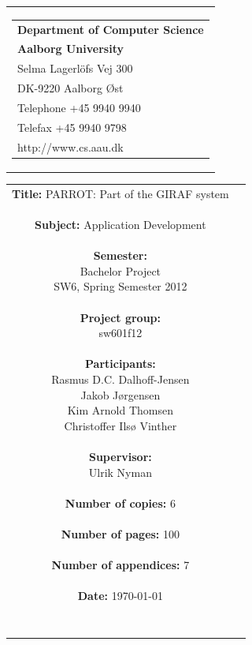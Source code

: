 \begin{nopagebreak}
\samepage 
\begin{tabular}{r}
\parbox{\textwidth}{
\hfill \parbox{6.2cm}{\begin{tabular}{l}
{\textsf\small \textbf{Department of Computer Science }}\\
{\textsf\small  \textbf{Aalborg University}}\\
{\textsf\small Selma Lagerlöfs Vej 300}\\
{\textsf\small DK-9220 Aalborg Øst}\\
{\textsf\small Telephone +45 9940 9940}\\
{\textsf\small Telefax +45 9940 9798}\\
{\textsf\small http://www.cs.aau.dk}
\end{tabular}}}
\end{tabular}

\begin{tabular}{cc}
\parbox{7cm}{
\textbf{Title:} 
PARROT: Part of the GIRAF system\\ \\
\textbf{Subject:} 
Application Development \\ \\
\textbf{Semester:} \\
Bachelor Project \\
SW6, Spring Semester 2012\\ \\
\textbf{Project group:} \\
sw601f12\\ \\
\textbf{Participants:} \\
Rasmus D.C. Dalhoff-Jensen \\
Jakob J\o{}rgensen \\
Kim Arnold Thomsen \\
Christoffer Ils\o{} Vinther\\ \\
\textbf{Supervisor:} \\
Ulrik Nyman\\ \\
\textbf{Number of copies:}
6 \\ \\
\textbf{Number of pages:}
100 \\ \\
\textbf{Number of appendices:}
7 \\ \\
\textbf{Date:}
\today \\ \\ \\
}


\end{tabular}
\end{nopagebreak}
